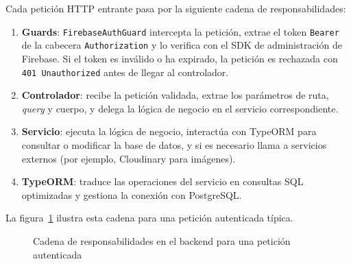 Cada petición HTTP entrante pasa por la siguiente cadena de responsabilidades:

\begin{enumerate}
    \item \textbf{Guards}: \texttt{FirebaseAuthGuard} intercepta la petición, extrae el token \texttt{Bearer} de la cabecera \texttt{Authorization} y lo verifica con el SDK de administración de Firebase. Si el token es inválido o ha expirado, la petición es rechazada con \texttt{401 Unauthorized} antes de llegar al controlador.
    \item \textbf{Controlador}: recibe la petición validada, extrae los parámetros de ruta, \textit{query} y cuerpo, y delega la lógica de negocio en el servicio correspondiente.
    \item \textbf{Servicio}: ejecuta la lógica de negocio, interactúa con TypeORM para consultar o modificar la base de datos, y si es necesario llama a servicios externos (por ejemplo, Cloudinary para imágenes).
    \item \textbf{TypeORM}: traduce las operaciones del servicio en consultas SQL optimizadas y gestiona la conexión con PostgreSQL.
\end{enumerate}

La figura~\ref{fig:flujo_backend} ilustra esta cadena para una petición autenticada típica.

\begin{figure}[H]
\centering
{}
\caption{Cadena de responsabilidades en el backend para una petición autenticada}
\label{fig:flujo_backend}
\end{figure}

